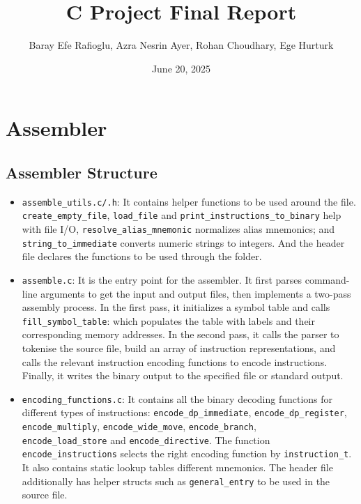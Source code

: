\documentclass{article}
\begin{document}
\title{C Project Final Report}
\author{Baray Efe Rafioglu, Azra Nesrin Ayer, Rohan Choudhary, Ege Hurturk}
\date{June 20, 2025}


\maketitle

\section{Assembler}
\subsection{Assembler Structure}

\begin{itemize}
    \item \verb|assemble_utils.c/.h|: It contains helper functions to be used around the file. \verb|create_empty_file|, \verb|load_file| and \verb|print_instructions_to_binary| help with file I/O, \verb|resolve_alias_mnemonic| normalizes alias mnemonics; and \verb|string_to_immediate| converts numeric strings to integers. And the header file declares the functions to be used through the folder.

\item \verb|assemble.c|: It is the entry point for the assembler. It first parses command-line arguments to get the input and output files, then implements a two-pass assembly process. In the first pass, it initializes a symbol table and calls \verb|fill_symbol_table|: which populates the table with labels and their corresponding memory addresses. In the second pass, it calls the parser to tokenise the source file, build an array of instruction representations, and calls the relevant instruction encoding functions to encode instructions. Finally, it writes the binary output to the specified file or standard output.
\item \verb|encoding_functions.c|: It contains all the binary decoding functions for different types of instructions: \verb|encode_dp_immediate|, \verb|encode_dp_register|, \verb|encode_multiply|, \verb|encode_wide_move|, \verb|encode_branch|,\\ \verb|encode_load_store| and \verb|encode_directive|. The function \verb|encode_instructions| selects the right encoding function by \verb|instruction_t|. It also contains static lookup tables different mnemonics. The header file additionally has helper structs such as \verb|general_entry| to be used in the source file.


\end{itemize}
\end{document}
